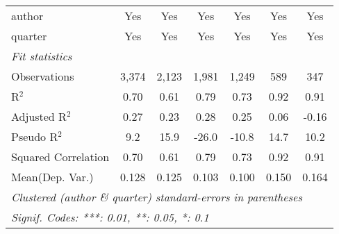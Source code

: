 \begin{tabular}{lcccccc}
   author                                                     & Yes         & Yes           & Yes          & Yes          & Yes            & Yes\\  
   quarter                                                    & Yes         & Yes           & Yes          & Yes          & Yes            & Yes\\  
   \midrule
   \emph{Fit statistics}\\
   Observations                                               & 3,374       & 2,123         & 1,981        & 1,249        & 589            & 347\\  
   R$^2$                                                      & 0.70        & 0.61          & 0.79         & 0.73         & 0.92           & 0.91\\  
   Adjusted R$^2$                                             & 0.27        & 0.23          & 0.28         & 0.25         & 0.06           & -0.16\\  
   Pseudo R$^2$                                               & 9.2         & 15.9          & -26.0        & -10.8        & 14.7           & 10.2\\  
   Squared Correlation                                        & 0.70        & 0.61          & 0.79         & 0.73         & 0.92           & 0.91\\  
Mean(Dep. Var.) & 0.128 & 0.125 & 0.103 & 0.100 & 0.150 & 0.164 \\
   \midrule \midrule
   \multicolumn{7}{l}{\emph{Clustered (author \& quarter) standard-errors in parentheses}}\\
   \multicolumn{7}{l}{\emph{Signif. Codes: ***: 0.01, **: 0.05, *: 0.1}}\\
\end{tabular}
\par\endgroup
